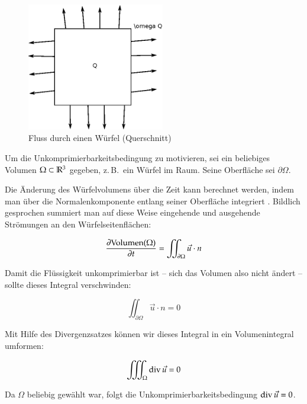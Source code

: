 \begin{figure}[ht]
\includegraphics[width=6cm]{images/incompressibility_condition_example}
\caption{Fluss durch einen Würfel (Querschnitt)}
\end{figure}

Um die Unkomprimierbarkeitsbedingung zu motivieren, sei ein beliebiges Volumen
$\Omega \subset \mathbb{R}^3$ gegeben, z.\,B.\ ein Würfel im Raum. Seine
Oberfläche sei $\partial \Omega$.

Die Änderung des Würfelvolumens über die Zeit kann berechnet werden,
indem man über die Normalenkomponente entlang seiner Oberfläche
integriert \cite{Chorin1980}. Bildlich gesprochen summiert man auf
diese Weise eingehende und ausgehende Strömungen an den
Würfelseitenflächen:

\begin{equation}
\frac{
	\partial \textnormal{Volumen}(\Omega)
}
{
	\partial t
}
=
\iint_{\partial \Omega} \vec{u} \cdot n
\end{equation}

Damit die Flüssigkeit unkomprimierbar ist -- sich das Volumen also
nicht ändert -- sollte dieses Integral verschwinden:

\begin{equation}
\iint_{\partial \Omega} \vec{u} \cdot n = 0
\end{equation}

Mit Hilfe des Divergenzsatzes können wir dieses Integral in ein Volumenintegral
umformen:

\begin{equation}
\iiint_\Omega \operatorname*{div} \vec{u} = 0
\end{equation}

Da $\Omega$ beliebig gewählt war, folgt die
Unkomprimierbarkeitsbedingung $\operatorname*{div} \vec{u} = 0$.

